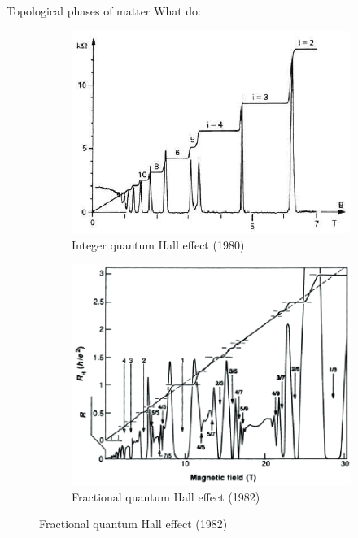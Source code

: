 \documentclass{beamer}
\begin{document}
\setcounter{framenumber}{0}
\begin{frame}{Topological phases of matter}
	What do:
	\begin{figure}
		\centering
		\begin{subfigure}[b]{0.4\textwidth}
			\centering
			\includegraphics[width=\textwidth]{Figures/IntegerQHE.png}
			\caption{Integer quantum Hall effect (1980)}
		\end{subfigure}
		\hfill
		\begin{subfigure}[b]{0.4\textwidth}
			\centering
			\includegraphics[width=\textwidth]{Figures/FractionalQHE.png}
			\caption{Fractional quantum Hall effect (1982)}
		\end{subfigure}
	\end{figure}
\end{frame}
\end{document}
